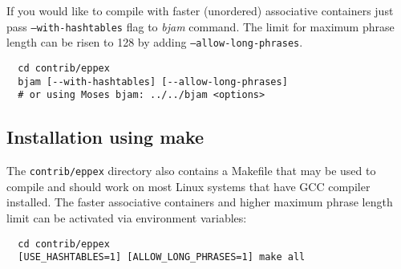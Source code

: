 If you would like to compile \eppex{} with faster (unordered) associative containers
just pass \texttt{--with-hashtables} flag to \emph{bjam} command.
The limit for maximum phrase length can be risen to 128 by adding
\texttt{--allow-long-phrases}.
\begin{verbatim}
  cd contrib/eppex
  bjam [--with-hashtables] [--allow-long-phrases]
  # or using Moses bjam: ../../bjam <options>
\end{verbatim}

\subsection*{Installation using make}
The \texttt{contrib/eppex} directory also contains a Makefile that may be used to compile
\eppex{} and should work on most Linux systems that have GCC compiler installed.
The faster associative containers and higher maximum phrase length limit can be activated
via environment variables:
\begin{verbatim}
  cd contrib/eppex
  [USE_HASHTABLES=1] [ALLOW_LONG_PHRASES=1] make all
\end{verbatim}
